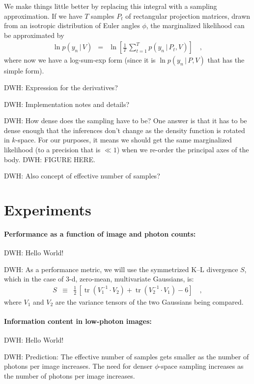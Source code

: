 \documentclass[12pt]{article}
\newcommand{\given}{\,|\,}
\DeclareMathOperator{\trace}{tr}
\begin{document}
We make things little better by replacing this integral with a
sampling approximation.
If we have $T$ samples $P_t$ of rectangular projection matrices, drawn
from an isotropic distribution of Euler angles $\phi$, the
marginalized likelihood can be approximated by
\begin{eqnarray}
  \ln p(y_n\given V) &=& \ln\left[\frac{1}{T}\,\sum_{t=1}^T p(y_n\given P_t,V)\right]
  \quad,
\end{eqnarray}
where now we have a log-sum-exp form (since it is $\ln p(y_n\given
P,V)$ that has the simple form).

DWH: Expression for the derivatives?

DWH: Implementation notes and details?

DWH: How dense does the sampling have to be?  One answer is that it
has to be dense enough that the inferences don't change as the density
function is rotated in $k$-space.  For our purposes, it means we
should get the same marginalized likelihood (to a precision that is
$\ll 1$) when we re-order the principal axes of the body.  DWH: FIGURE HERE.

DWH: Also concept of effective number of samples?

\section{Experiments}

\paragraph{Performance as a function of image and photon counts:}
DWH: Hello World!

DWH: As a performance metric, we will use the symmetrized K--L
divergence $S$, which in the case of 3-d, zero-mean, multivariate
Gaussians, is:
\begin{eqnarray}
  S &\equiv& \frac{1}{2}\,\left[\trace(V_1^{-1}\cdot V_2)
                              + \trace(V_2^{-1}\cdot V_1)
                              - 6\right]
  \quad,
\end{eqnarray}
where $V_1$ and $V_2$ are the variance tensors of the two Gaussians
being compared.

\paragraph{Information content in low-photon images:}
DWH: Hello World!

DWH: Prediction: The effective number of samples gets smaller as the
number of photons per image increases.  The need for denser
$\phi$-space sampling increases as the number of photons per image
increases.
\end{document}
